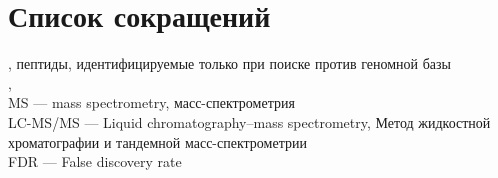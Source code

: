 \section{Список сокращений}
\noindent
{}, пептиды, идентифицируемые только при поиске против геномной базы \\
, \\
MS --- mass spectrometry, масс-спектрометрия \\
LC-MS/MS --- Liquid chromatography–mass spectrometry, Метод жидкостной хроматографии и тандемной масс-спектрометрии \\
FDR --- False discovery rate
\newpage
